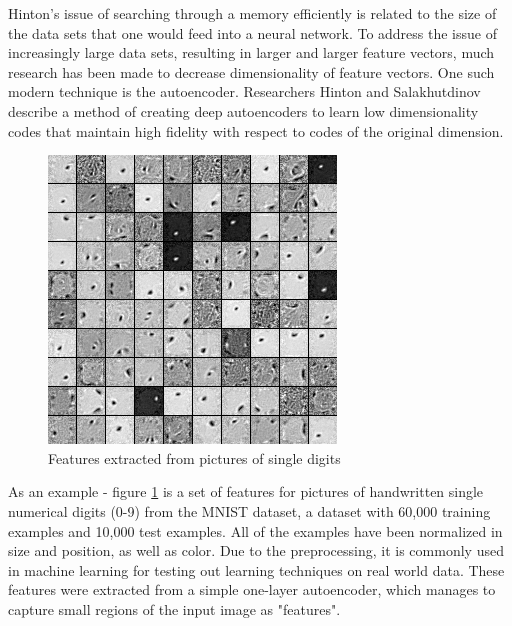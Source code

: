 \documentclass{sig-alternate}
\begin{document}
Hinton's issue of searching through a memory efficiently is related to the size of the data sets that
one would feed into a neural network.  To address the issue of increasingly large data sets, 
resulting in larger and larger feature vectors, much research has been made to decrease 
dimensionality of feature vectors. One such modern technique is the autoencoder. Researchers Hinton 
and Salakhutdinov ~\cite{autoencoder} describe a method of creating deep autoencoders to learn low 
dimensionality codes that maintain high fidelity with respect to codes of the original dimension.

\begin{figure}[h]
	\begin{center}
		\includegraphics[width=0.75\linewidth]{filters_corruption_30.png}
	\end{center}
	\vspace{-12pt}
	\caption{Features extracted from pictures of single digits}
	\label{fig:features}
\end{figure}

As an example - figure \ref{fig:features} is a set of features for pictures of handwritten single 
numerical digits (0-9) from the 
MNIST dataset, a dataset with 60,000 training examples
and 10,000 test examples. All of the examples have 
been normalized in size and position, as well as color. Due to the preprocessing, 
it is commonly used in machine learning for testing out learning techniques on real world data. 
These features were extracted from a simple one-layer autoencoder, which manages to capture small
regions of the input image as "features". 
\end{document}

